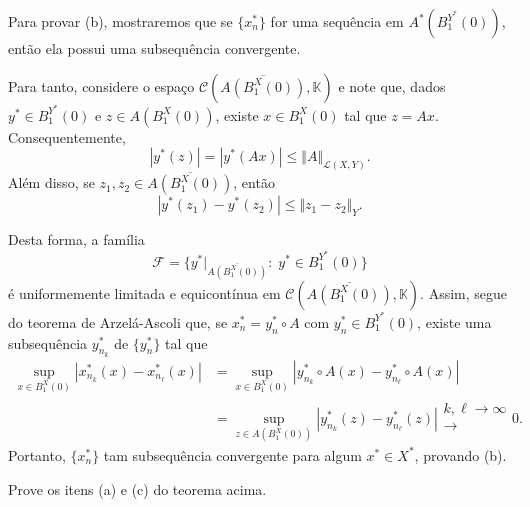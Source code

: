 \documentclass[../functional_analysis.tex]{subfiles}
\begin{document}
\begin{proof*}
	Para provar (b), mostraremos que se \(\{x_{n}^{*}\}\) for uma sequência em \(A^{*}(B_{1}^{Y^{*}}(0))\), então ela possui uma subsequência convergente.

	Para tanto, considere o espaço \(\mathcal{C}(\overline{A(B_{1}^{X}(0))}, \mathbb{K})\) e note que, dados \(y^{*}\in B_{1}^{Y^{*}}(0)\) e \(z\in A(B_{1}^{X}(0))\),
	existe \(x\in B_{1}^{X}(0)\) tal que \(z = Ax\). Consequentemente,
	\[
		| y^{*}(z) | = | y^{*}(Ax) |\leq \Vert A \Vert_{\mathcal{L}(X, Y)}.
	\]
	Além disso, se \(z_1, z_2\in \overline{A(B_{1}^{X}(0))}\), então
	\[
		| y^{*}(z_1) - y^{*}(z_2) | \leq \Vert z_1 - z_2 \Vert_{Y}.
	\]

	Desta forma, a família
	\[
		\mathcal{F} = \biggl\{y^{*}|_{\overline{A(B_{1}^{X}(0))}}:\; y^{*}\in B_{1}^{Y^{*}}(0)\biggr\}
	\]
	é uniformemente limitada e equicontínua em \(\mathcal{C}(\overline{A(B_{1}^{X}(0))}, \mathbb{K})\). Assim, segue do teorema de Arzelá-Ascoli que,
	se \(x_{n}^{*} = y_{n}^{*}\circ A\) com \(y_{n}^{*}\in B_{1}^{Y^{*}}(0)\), existe uma subsequência \(y_{n_k}^{*}\) de \(\{y_{n}^{*}\}\) tal que
	\begin{align*}
		\sup_{x\in B_{1}^{X}(0)}| x_{n_k}^{*}(x) - x_{n_{\ell}}^{*}(x) | & = \sup_{x\in B_{1}^{X}(0)}| y_{n_{k}}^{*}\circ A(x)-y_{n_{\ell}}^{*}\circ A(x) |                    \\
		                                                                 & = \sup_{z\in A(B_{1}^{X}(0))}| y_{n_k}^{*}(z) - y_{n_{\ell}}^{*}(z) | \substack{ k, \ell \to \infty \\ \longrightarrow \\ }0.
	\end{align*}
	Portanto, \(\{x_{n}^{*}\}\) tam subsequência convergente para algum \(x^{*}\in X^{*}\), provando (b). \qedsymbol
\end{proof*}
\begin{exr}
	Prove os itens (a) e (c) do teorema acima.
\end{exr}
\end{document}
